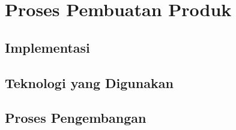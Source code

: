 \chapter{Proses Pembuatan Produk}

\section{Implementasi}

\section{Teknologi yang Digunakan}

\section{Proses Pengembangan}
